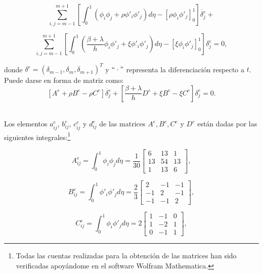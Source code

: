 $$ \sum_{i,j=m-1}^{m+1}\left[\int_{0}^{1}(\phi_{i}\phi_{j}+\rho\phi'_{i}\phi'_{j})d\eta - \left [\rho \phi_{i}\phi'_{j} \right ]_{0}^{1} \right]\dot{\delta_{j}^{e}}+$$
    
$$ \sum_{i,j=m-1}^{m+1}\left[\int_{0}^{1}(\frac{\beta+\lambda}{h}\phi_{i}\phi'_{j}+\xi\phi'_{i}\phi'_{j})d\eta - \left [\xi \phi_{i}\phi'_{j}\right]_{0}^{1} \right]\delta_{j}^{e}=0,$$

\noindent donde $\delta^{e}=(\delta_{m-1},\delta_{m},\delta_{m+1})^{T}$ y $``\cdot"$ representa la diferenciación respecto a $t$. Puede darse en forma de matriz como:
\begin{equation}
\label{ecABCD_}
    \left[A^{e}+\rho B^{e} - \rho C^{e}\right]\dot{\delta_{j}^{e}}+\left[\frac{\beta + \lambda}{h}D^{e}+\xi B^{e}-\xi C^{e}\right]\delta_{j}^{e}=0.
\end{equation}

\\

Los elementos $a_{ij}^{e}$, $b_{ij}^{e}$, $c_{ij}^{e}$ y $d_{ij}^{e}$ de las matrices $A^{e}, B^{e},C^{e}$ y $ D^{e}$ están dadas por las siguientes integrales:\footnote{Todas las cuentas realizadas para la obtención de las matrices han sido verificadas apoyándome en el software Wolfram Mathematica.}

\begin{equation}
A^{e}_{ij}=\int_{0}^{1}\phi_{i}\phi_{j} d\eta=\frac{1}{30}
\begin{bmatrix}
6 & 13 & 1\\
13 & 54 & 13\\
1 & 13 & 6
\end{bmatrix},
\end{equation}

\begin{equation}
B^{e}_{ij}=\int_{0}^{1}\phi'_{i}\phi'_{j} d\eta=\frac{2}{3}
\begin{bmatrix}
2 & -1 & -1\\
-1 & 2 & -1\\
-1 & -1 & 2
\end{bmatrix},
\end{equation}

\begin{equation}
C^{e}_{ij}=\int_{0}^{1}\phi_{i}\phi'_{j} d\eta=2
\begin{bmatrix}
1 & -1 & 0\\
1 & -2 & 1\\
0 & -1 & 1
\end{bmatrix},
\end{equation}

